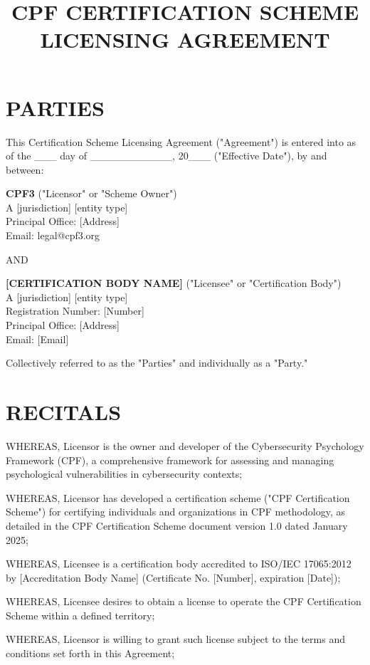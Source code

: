 \documentclass[11pt,a4paper]{article}
\title{\textbf{CPF CERTIFICATION SCHEME\\LICENSING AGREEMENT}}
\author{}
\date{}
\begin{document}
\maketitle

\section*{PARTIES}

This Certification Scheme Licensing Agreement ("Agreement") is entered into as of the \_\_\_ day of \_\_\_\_\_\_\_\_\_\_\_, 20\_\_\_ ("Effective Date"), by and between:

\textbf{CPF3} ("Licensor" or "Scheme Owner")\\
A [jurisdiction] [entity type]\\
Principal Office: [Address]\\
Email: legal@cpf3.org

AND

\textbf{[CERTIFICATION BODY NAME]} ("Licensee" or "Certification Body")\\
A [jurisdiction] [entity type]\\
Registration Number: [Number]\\
Principal Office: [Address]\\
Email: [Email]

Collectively referred to as the "Parties" and individually as a "Party."

\section*{RECITALS}

WHEREAS, Licensor is the owner and developer of the Cybersecurity Psychology Framework (CPF), a comprehensive framework for assessing and managing psychological vulnerabilities in cybersecurity contexts;

WHEREAS, Licensor has developed a certification scheme ("CPF Certification Scheme") for certifying individuals and organizations in CPF methodology, as detailed in the CPF Certification Scheme document version 1.0 dated January 2025;

WHEREAS, Licensee is a certification body accredited to ISO/IEC 17065:2012 by [Accreditation Body Name] (Certificate No. [Number], expiration [Date]);

WHEREAS, Licensee desires to obtain a license to operate the CPF Certification Scheme within a defined territory;

WHEREAS, Licensor is willing to grant such license subject to the terms and conditions set forth in this Agreement;
\end{document}
